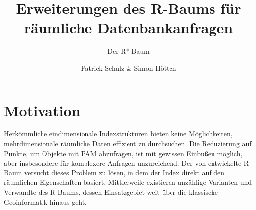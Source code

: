 \documentclass[runningheads,a4paper]{llncs}
\begin{document}
\mainmatter  %

\title{Erweiterungen des R-Baums für räumliche Datenbankanfragen}

\subtitle{Der R*-Baum}


\author{Patrick Schulz \& Simon Hötten}


\maketitle




\section{Motivation} %
\label{sec:intro}

	Herkömmliche eindimensionale Indexstrukturen bieten keine Möglichkeiten, mehrdimensionale räumliche Daten effizient zu durchsuchen. Die Reduzierung auf Punkte, um Objekte mit \ac{PAM} abzufragen, ist mit gewissen Einbußen möglich, aber insbesondere für komplexere Anfragen unzureichend.
	Der von \Textcite{Guttman:1984} entwickelte R-Baum versucht dieses Problem zu lösen, in dem der Index direkt auf den räumlichen Eigenschaften basiert. Mittlerweile existieren unzählige Varianten und Verwandte des R-Baums, dessen Einsatzgebiet weit über die klassische Geoinformatik hinaus geht.
\end{document}
